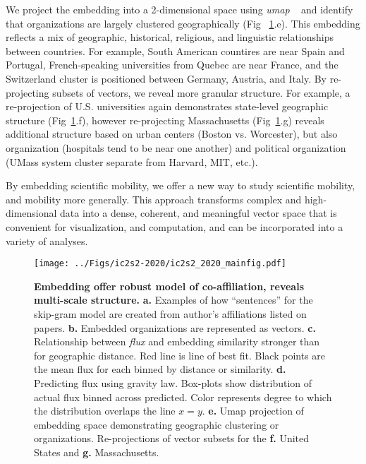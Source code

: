 \documentclass[a4paper,12pt]{article}
\begin{document}
We project the embedding into a 2-dimensional space using \textit{umap} ~\autocite{mcinnes_umap_2018} and identify that organizations are largely clustered geographically (Fig ~\ref{fig:image}.e).
This embedding reflects a mix of geographic, historical, religious, and linguistic relationships between countries. 
For example, South American countires are near Spain and Portugal, French-speaking universities from Quebec are near France, and the Switzerland cluster is positioned between Germany, Austria, and Italy. 
By re-projecting subsets of vectors, we reveal more granular structure.
For example, a re-projection of U.S. universities again demonstrates state-level geographic structure (Fig~\ref{fig:image}.f), however re-projecting Massachusetts (Fig~\ref{fig:image}.g) reveals additional structure based on urban centers (Boston vs. Worcester), but also organization (hospitals tend to be near one another) and political organization (UMass system cluster separate from Harvard, MIT, etc.).

By embedding scientific mobility, we offer a new way to study scientific mobility, and mobility more generally. 
This approach transforms complex and high-dimensional data into a dense, coherent, and meaningful vector space that is convenient for visualization, and computation, and can be incorporated into a variety of analyses. 


\begin{figure}[ht!]
	\centering
	\texttt{[image: ../Figs/ic2s2-2020/ic2s2\_2020\_mainfig.pdf]}
	\caption{ 
	\textbf{Embedding offer robust model of co-affiliation, reveals multi-scale structure.}
	\textbf{a.} Examples of how ``sentences'' for the skip-gram model are created from author's affiliations listed on papers.
	\textbf{b.} Embedded organizations are represented as vectors.
	\textbf{c.} Relationship between \textit{flux} and embedding similarity stronger than for geographic distance. 
	Red line is line of best fit.
	Black points are the mean flux for each binned by distance or similarity. 
	\textbf{d.} Predicting flux using gravity law.
	Box-plots show distribution of actual flux binned across predicted.
	Color represents degree to which the distribution overlaps the line $x = y$. 
	\textbf{e.} Umap projection of embedding space demonstrating geographic clustering or organizations.
	Re-projections of vector subsets for the \textbf{f.} United States and \textbf{g.} Massachusetts. 
	 }
	\label{fig:image}
\end{figure}

%
%
%
\begingroup
{}
\small
\setlength\bibitemsep{1pt}
{\renewcommand{\markboth}[2]{}%
\printbibliography}
\endgroup
\end{document}

